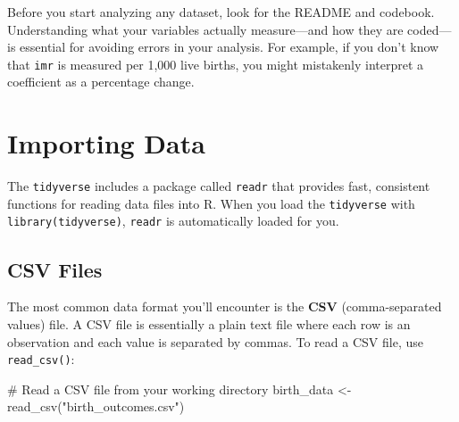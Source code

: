 \documentclass[
  letterpaper,
  DIV=11,
  numbers=noendperiod]{scrreprt}
\newenvironment{Shaded}{\begin{snugshade}}{\end{snugshade}}
\newcommand{\CommentTok}[1]{\textcolor[rgb]{0.37,0.37,0.37}{#1}}
\newcommand{\FunctionTok}[1]{\textcolor[rgb]{0.28,0.35,0.67}{#1}}
\newcommand{\NormalTok}[1]{\textcolor[rgb]{0.00,0.23,0.31}{#1}}
\newcommand{\OtherTok}[1]{\textcolor[rgb]{0.00,0.23,0.31}{#1}}
\newcommand{\StringTok}[1]{\textcolor[rgb]{0.13,0.47,0.30}{#1}}
\begin{document}
\begin{tcolorbox}[enhanced jigsaw, arc=.35mm, bottomrule=.15mm, bottomtitle=1mm, breakable, colback=white, colbacktitle=quarto-callout-important-color!10!white, colframe=quarto-callout-important-color-frame, coltitle=black, left=2mm, leftrule=.75mm, opacityback=0, opacitybacktitle=0.6, rightrule=.15mm, title=\textcolor{quarto-callout-important-color}{\faExclamation}\hspace{0.5em}{Always Look for Documentation First}, titlerule=0mm, toprule=.15mm, toptitle=1mm]

Before you start analyzing any dataset, look for the README and
codebook. Understanding what your variables actually measure---and how
they are coded---is essential for avoiding errors in your analysis. For
example, if you don't know that \texttt{imr} is measured per 1,000 live
births, you might mistakenly interpret a coefficient as a percentage
change.

\end{tcolorbox}

\section{Importing Data}\label{importing-data}

The \texttt{tidyverse} includes a package called \texttt{readr} that
provides fast, consistent functions for reading data files into R. When
you load the \texttt{tidyverse} with \texttt{library(tidyverse)},
\texttt{readr} is automatically loaded for you.

\subsection{CSV Files}\label{csv-files}

The most common data format you'll encounter is the \textbf{CSV}
(comma-separated values) file. A CSV file is essentially a plain text
file where each row is an observation and each value is separated by
commas. To read a CSV file, use \texttt{read\_csv()}:

\begin{Shaded}
\begin{Highlighting}[]
\CommentTok{\# Read a CSV file from your working directory}
\NormalTok{birth\_data }\OtherTok{\textless{}{-}} \FunctionTok{read\_csv}\NormalTok{(}\StringTok{"birth\_outcomes.csv"}\NormalTok{)}
\end{Highlighting}
\end{Shaded}
\end{document}
